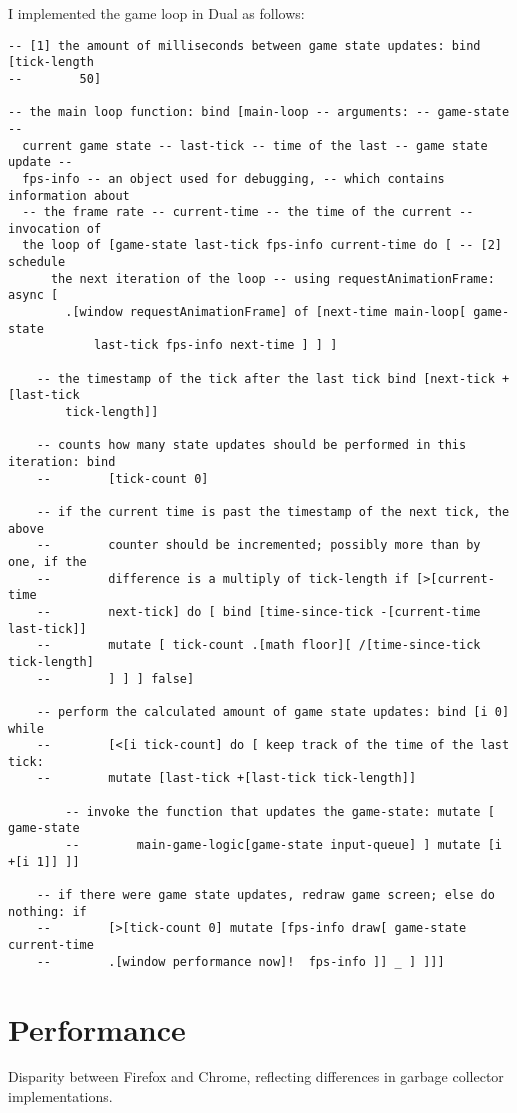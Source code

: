 I implemented the game loop in Dual as follows:
\begin{lstlisting}
-- [1] the amount of milliseconds between game state updates: bind [tick-length
--        50]

-- the main loop function: bind [main-loop -- arguments: -- game-state --
  current game state -- last-tick -- time of the last -- game state update --
  fps-info -- an object used for debugging, -- which contains information about
  -- the frame rate -- current-time -- the time of the current -- invocation of
  the loop of [game-state last-tick fps-info current-time do [ -- [2] schedule
      the next iteration of the loop -- using requestAnimationFrame: async [
        .[window requestAnimationFrame] of [next-time main-loop[ game-state
            last-tick fps-info next-time ] ] ]
    
    -- the timestamp of the tick after the last tick bind [next-tick +[last-tick
        tick-length]]
    
    -- counts how many state updates should be performed in this iteration: bind
    --        [tick-count 0]
    
    -- if the current time is past the timestamp of the next tick, the above
    --        counter should be incremented; possibly more than by one, if the
    --        difference is a multiply of tick-length if [>[current-time
    --        next-tick] do [ bind [time-since-tick -[current-time last-tick]]
    --        mutate [ tick-count .[math floor][ /[time-since-tick tick-length]
    --        ] ] ] false]
    
    -- perform the calculated amount of game state updates: bind [i 0] while
    --        [<[i tick-count] do [ keep track of the time of the last tick:
    --        mutate [last-tick +[last-tick tick-length]]
        
        -- invoke the function that updates the game-state: mutate [ game-state
        --        main-game-logic[game-state input-queue] ] mutate [i +[i 1]] ]]

    -- if there were game state updates, redraw game screen; else do nothing: if
    --        [>[tick-count 0] mutate [fps-info draw[ game-state current-time
    --        .[window performance now]!  fps-info ]] _ ] ]]]
\end{lstlisting}


\section{Performance}
Disparity between Firefox and Chrome, reflecting differences in garbage
collector implementations.

